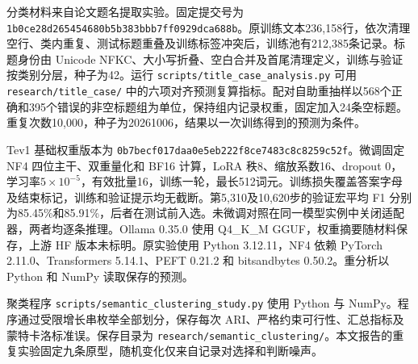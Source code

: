 \documentclass[UTF8,a4paper,zihao=-4,fontset=fandol]{ctexart}
\begin{document}
分类材料来自论文题名提取实验\citep{title-case}。固定提交号为 \nolinkurl{1b0ce28d265454680b5b383bbb7ff0929dca688b}。原训练文本236,158行，依次清理空行、类内重复、测试标题重叠及训练标签冲突后，训练池有212,385条记录。标题身份由 Unicode NFKC、大小写折叠、空白合并及首尾清理定义，训练与验证按类别分层，种子为42。运行 \nolinkurl{scripts/title_case_analysis.py} 可用 \nolinkurl{research/title_case/} 中的六项对齐预测复算指标。配对自助重抽样以568个正确和395个错误的非空标题组为单位，保持组内记录权重，固定加入24条空标题。重复次数10,000，种子为20261006，结果以一次训练得到的预测为条件。

Tev1 基础权重版本为 \nolinkurl{0b7becf017daa0e5eb222f8ce7483c8c8259c52f}。微调固定 NF4 四位主干、双重量化和 BF16 计算，LoRA 秩8、缩放系数16、dropout 0，学习率$5\times10^{-5}$，有效批量16，训练一轮，最长512词元。训练损失覆盖答案字母及结束标记，训练和验证提示均无截断。第5,310及10,620步的验证宏平均 F1 分别为85.45\%和85.91\%，后者在测试前入选。未微调对照在同一模型实例中关闭适配器，两者均逐条推理。Ollama 0.35.0 使用 Q4\_K\_M GGUF，权重摘要随材料保存，上游 HF 版本未标明。原实验使用 Python 3.12.11，NF4 依赖 PyTorch 2.11.0、Transformers 5.14.1、PEFT 0.21.2 和 bitsandbytes 0.50.2。重分析以 Python 和 NumPy 读取保存的预测。

聚类程序 \nolinkurl{scripts/semantic_clustering_study.py} 使用 Python 与 NumPy。程序通过受限增长串枚举全部划分，保存每次 ARI、严格约束可行性、汇总指标及蒙特卡洛标准误。保存目录为 \nolinkurl{research/semantic_clustering/}。本文报告的重复实验固定九条原型，随机变化仅来自记录对选择和判断噪声。
\end{document}
